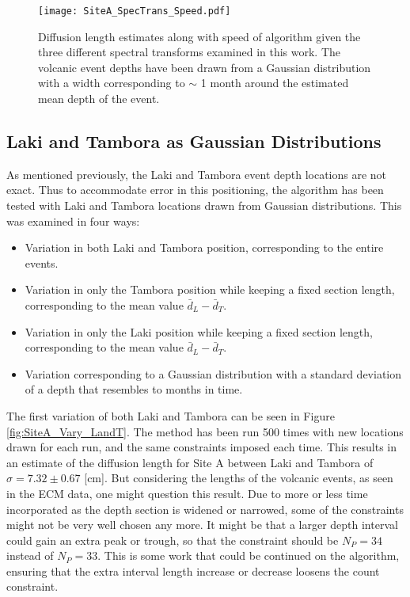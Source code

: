 \documentclass[../../CompleteThesis2/Complete_2ndDraft]{subfiles}
\begin{document}
\begin{figure}[!htb]
	\centering
	\texttt{[image: SiteA\_SpecTrans\_Speed.pdf]}
	\caption[Speed and $\sigma$ estimates, spectral transforms]{\small Diffusion length estimates along with speed of algorithm given the three different spectral transforms examined in this work. The volcanic event depths have been drawn from a Gaussian distribution with a width corresponding to $\sim$ 1 month around the estimated mean depth of the event.}
	\label{fig:SiteA_SpecTrans_Speed}
\end{figure}




\subsection[LT locations]{Laki and Tambora as Gaussian Distributions}
\label{Subsec:Method_TestStab_LTlocations}
As mentioned previously, the Laki and Tambora event depth locations are not exact. Thus to accommodate error in this positioning, the algorithm has been tested with Laki and Tambora locations drawn from Gaussian distributions. This was examined in four ways:

\begin{itemize}
	\item Variation in both Laki and Tambora position, corresponding to the entire events.
	\item Variation in only the Tambora position while keeping a fixed section length, corresponding to the mean value $\bar{d}_{L}-\bar{d}_{T}$.
	\item Variation in only the Laki position while keeping a fixed section length, corresponding to the mean value $\bar{d}_{L}-\bar{d}_{T}$.
	\item Variation corresponding to a Gaussian distribution with a standard deviation of a depth that resembles to months in time.
	
\end{itemize}

The first variation of both Laki and Tambora can be seen in Figure \ref{fig:SiteA_Vary_LandT}. The method has been run 500 times with new locations drawn for each run, and the same constraints imposed each time. This results in an estimate of the diffusion length for Site A between Laki and Tambora of $\sigma=7.32\pm 0.67$ [cm]. But considering the lengths of the volcanic events, as seen in the ECM data, one might question this result. Due to more or less time incorporated as the depth section is widened or narrowed, some of the constraints might not be very well chosen any more. It might be that a larger depth interval could gain an extra peak or trough, so that the constraint should be $N_P=34$ instead of $N_P =33$. This is some work that could be continued on the algorithm, ensuring that the extra interval length increase or decrease loosens the count constraint.
\end{document}
